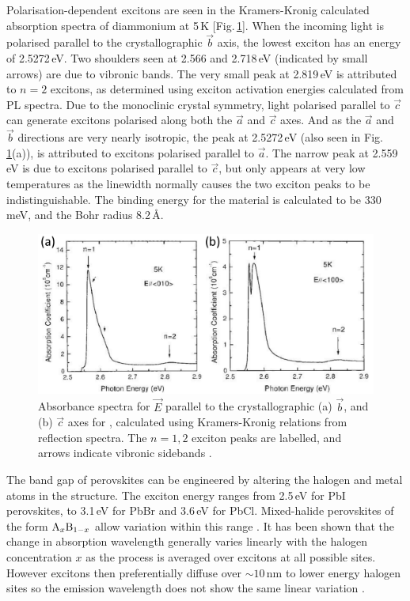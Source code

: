Polarisation-dependent excitons are seen in the Kramers-Kronig calculated absorption spectra of diammonium  at 5\,K [Fig.\,\ref{2Fig14}]. When the incoming light is polarised parallel to the crystallographic $\vec{b}$ axis, the lowest exciton has an energy of 2.5272\,eV. Two shoulders seen at 2.566 and 2.718\,eV (indicated by small arrows) are due to vibronic bands. The very small peak at 2.819\,eV is attributed to $n=2$ excitons, as determined using exciton activation energies calculated from PL spectra. Due to the monoclinic crystal symmetry, light polarised parallel to $\vec{c}$ can generate excitons polarised along both the $\vec{a}$ and $\vec{c}$ axes. And as the $\vec{a}$ and $\vec{b}$ directions are very nearly isotropic, the peak at 2.5272\,eV (also seen in Fig.\,\ref{2Fig14}(a)), is attributed to excitons polarised parallel to $\vec{a}$. The narrow peak at 2.559\,eV is due to excitons polarised parallel to $\vec{c}$, but only appears at very low temperatures as the linewidth normally causes the two exciton peaks to be indistinguishable. The binding energy for the material is calculated to be 330\,meV, and the Bohr radius 8.2\,\AA \cite{Goto2001}.
\begin{figure} [h!]
\centering
\includegraphics[width=\textwidth]{Fig14}
\caption{Absorbance spectra for $\vec{E}$ parallel to the crystallographic (a) $\vec{b}$, and (b) $\vec{c}$ axes for , calculated using Kramers-Kronig relations from reflection spectra. The $n=1, 2$ exciton peaks are labelled, and arrows indicate vibronic sidebands \cite{Goto2001}.}
\label{2Fig14}
\end{figure}

The band gap of perovskites can be engineered by altering the halogen and metal atoms in the structure. The exciton energy ranges from 2.5\,eV for PbI perovskites, to 3.1\,eV for PbBr and 3.6\,eV for PbCl. Mixed-halide perovskites of the form $\textnormal{A}_x\textnormal{B}_{1-x}$ allow variation within this range \cite{Kitazawa1996, Kitazawa1997}. It has been shown that the change in absorption wavelength generally varies linearly with the halogen concentration $x$ as the process is averaged over excitons at all possible sites. However excitons then preferentially diffuse over $\sim10$\,nm to lower energy halogen sites so the emission wavelength does not show the same linear variation \cite{Ahmad2013}.

